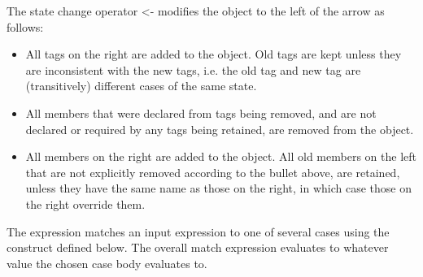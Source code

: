 The state change operator <- modifies the object to the left of the
arrow as follows:

\begin{itemize}

\item
All tags on the right are added to the object.  Old tags are kept
unless they are inconsistent with the new tags, i.e. the old tag and
new tag are (transitively) different cases of the same state.

\item
All members that were declared from tags being removed, and are not
declared or required by any tags being retained, are removed from
the object.

\item
All members on the right are added to the object.  All old members on
the left that are not explicitly removed according to the bullet
above, are retained, unless they have the same name as those on the
right, in which case those on the right override them.  

\end{itemize}







The  expression matches an input expression to one of
several cases using the  construct defined below.
The overall match expression evaluates to whatever value the
chosen case body evaluates to.

